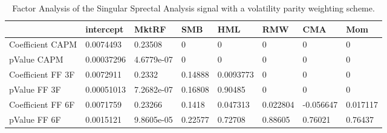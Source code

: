 \begin{table}[H]
\centering
\begin{tabular}{llllllll}
& intercept & MktRF & SMB & HML & RMW & CMA & Mom \\ 
\hline 
Coefficient CAPM & 0.0074493 & 0.23508 & 0 & 0 & 0 & 0 & 0 \\ 
pValue CAPM & 0.00037296 & 4.6779e-07 & 0 & 0 & 0 & 0 & 0 \\ 
Coefficient FF 3F & 0.0072911 & 0.2332 & 0.14888 & 0.0093773 & 0 & 0 & 0 \\ 
pValue FF 3F & 0.00051013 & 7.2682e-07 & 0.16808 & 0.90485 & 0 & 0 & 0 \\ 
Coefficient FF 6F & 0.0071759 & 0.23266 & 0.1418 & 0.047313 & 0.022804 & -0.056647 & 0.017117 \\ 
pValue FF 6F & 0.0015121 & 9.8605e-05 & 0.22577 & 0.72708 & 0.88605 & 0.76021 & 0.76437 \\ 
\hline
\end{tabular}
\caption{Factor Analysis of the Singular Sprectal Analysis signal with a volatility parity weighting scheme.}
\label{SSA_Quantity_FACTOR}
\end{table}